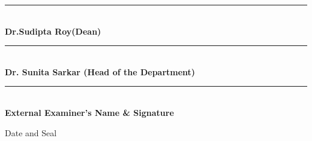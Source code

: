 \documentclass[10pt, oneside]{Thesis} %
\begin{document}
\begin{center}
{\begin{flushleft}
 \rule[1em]{30em}{0.5pt}\\  \textbf{Dr.Sudipta Roy(Dean)}  \\ \vspace{1cm}
 \rule[1em]{30em}{0.5pt}\\ \textbf{Dr. Sunita Sarkar (Head of the Department)}  \\ \vspace{1cm}
\rule[1em]{30em}{0.5pt}\\ \textbf{External Examiner's Name \& Signature}  \\
\begin{flushright}
Date and Seal
\end{flushright}
\end{flushleft} \large








}
\end{center}
\clearpage

















\end{document}
